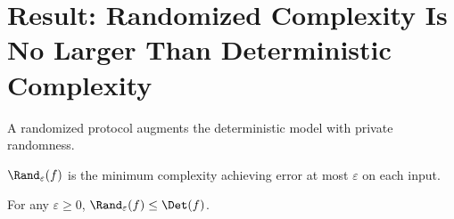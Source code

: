 \chapter{Result: Randomized Complexity Is No Larger Than Deterministic Complexity}

\begin{definition}
  \label{def:rand_protocol}
  \leanok
  A randomized protocol augments the deterministic model with private randomness.
\end{definition}

\begin{definition}
  \label{def:rand_cc}
  \leanok
  $\Rand_\varepsilon(f)$ is the minimum complexity achieving error at most
  $\varepsilon$ on each input.
\end{definition}

\begin{theorem}[Result 1]
  \label{thm:rand_le_det}
  \leanok
  For any $\varepsilon \ge 0$, $\Rand_\varepsilon(f) \le \Det(f)$.
\end{theorem}
